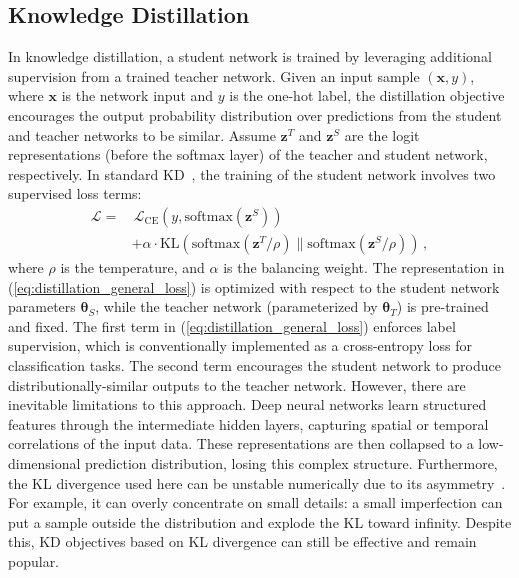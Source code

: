 \documentclass[final]{cvpr}
\newcommand{\zv}{{\boldsymbol z}}
\theoremstyle{definition}
\begin{document}
\subsection{Knowledge Distillation}\label{sec:model}
In knowledge distillation, a student network is trained by leveraging additional supervision from a trained teacher network. Given an input sample $(\bm x, y)$, where $\bm x$ is the network input and $y$ is the one-hot label, the distillation objective encourages the output probability distribution over predictions from the student and teacher networks to be similar. Assume $\zv^T$ and $\zv^S$ are the logit representations (before the softmax layer) of the teacher and student network, respectively. In standard KD~\cite{hinton2015distilling}, the training of the student network involves two supervised loss terms:
\begin{align}\label{eq:distillation_general_loss}
\mathcal{L} = & \, \mathcal{L}_{\mathrm{CE}}\left(y, \mathrm{softmax}(\zv^S) \right) \nonumber \\&+ \alpha \cdot \mathrm{KL}\left( \mathrm{softmax}(\zv^T / \rho) \| \mathrm{softmax}(\zv^S / \rho)  \right)\,, 
\end{align}
where $\rho$ is the temperature, and $\alpha$ is the balancing weight.
The representation in (\ref{eq:distillation_general_loss}) is optimized with respect to the student network parameters $\bm \theta_S$, while the teacher network (parameterized by $\bm \theta_T$) is pre-trained and fixed. The first term in (\ref{eq:distillation_general_loss}) enforces label supervision, which is conventionally implemented as a cross-entropy loss for classification tasks. The second term encourages the student network to produce distributionally-similar outputs to the teacher network. However, there are inevitable limitations to this approach. Deep neural networks learn structured features through the intermediate hidden layers, capturing spatial or temporal correlations of the input data.
These representations are then collapsed to a low-dimensional prediction distribution, losing this complex structure.
Furthermore, 
the KL divergence used here can be unstable numerically due to its asymmetry~\cite{chen2017symmetric, ozair2019wasserstein}. For example, it can overly concentrate on small details: a small imperfection can put a sample outside the distribution and explode the KL toward infinity.
Despite this, KD objectives based on KL divergence can still be effective and remain popular.
\end{document}
